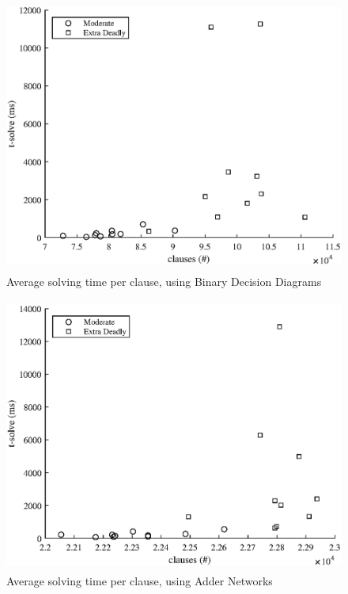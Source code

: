 {\begin{figure}
    \centering
    \includegraphics[height = 90mm]{Figures/killer_BDD_solve.eps}
    \caption{Average solving time per clause, using Binary Decision Diagrams}
    \label{killerBDDsolve}
\end{figure}

\begin{figure}
    \centering
    \includegraphics[height = 90mm]{Figures/killer_AN_solve.eps}
    \caption{Average solving time per clause, using Adder Networks}
    \label{killerANsolve}
\end{figure}

}

